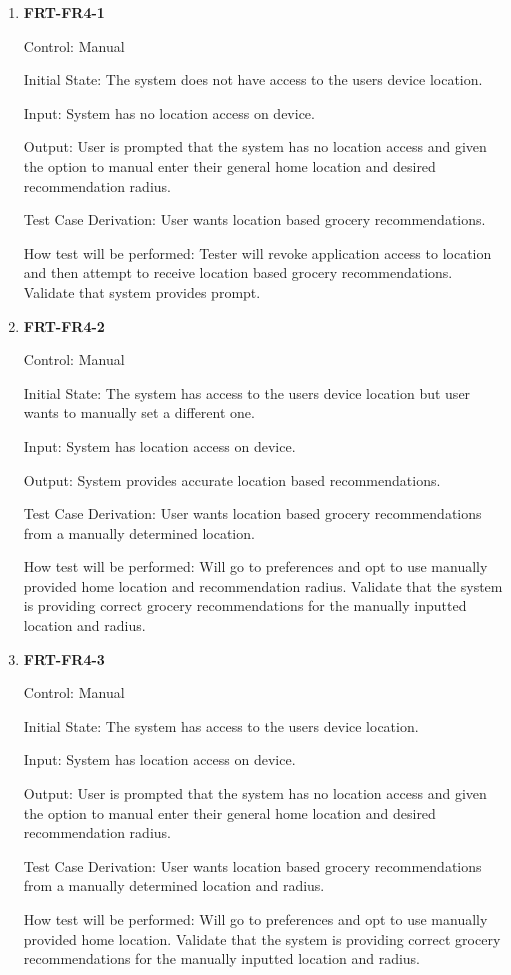 \documentclass[12pt, titlepage]{article}
\begin{document}
\begin{enumerate}

\item{\textbf{FRT-FR4-1}}

Control: Manual
          
Initial State: The system does not have access to the users device location.

Input: System has no location access on device.
          
Output: User is prompted that the system has no location access and given the option to manual enter their general home location and desired recommendation radius.

Test Case Derivation: User wants location based grocery recommendations.
          
How test will be performed: Tester will revoke application access to location  and then attempt to receive location based grocery recommendations. Validate that system provides prompt.

\item{\textbf{FRT-FR4-2}}

Control: Manual
          
Initial State: The system has access to the users device location but user wants to manually set a different one.

Input: System has location access on device.
          
Output: System provides accurate location based recommendations.

Test Case Derivation: User wants location based grocery recommendations from a manually determined location.
          
How test will be performed: Will go to preferences and opt to use manually provided home location and recommendation radius. Validate that the system is providing correct grocery recommendations for the manually inputted location and radius.

\item{\textbf{FRT-FR4-3}}

Control: Manual
          
Initial State: The system has access to the users device location.

Input: System has location access on device.
          
Output: User is prompted that the system has no location access and given the option to manual enter their general home location and desired recommendation radius.

Test Case Derivation: User wants location based grocery recommendations from a manually determined location and radius.
          
How test will be performed: Will go to preferences and opt to use manually provided home location. Validate that the system is providing correct grocery recommendations for the manually inputted location and radius.


\end{enumerate}
\end{document}
